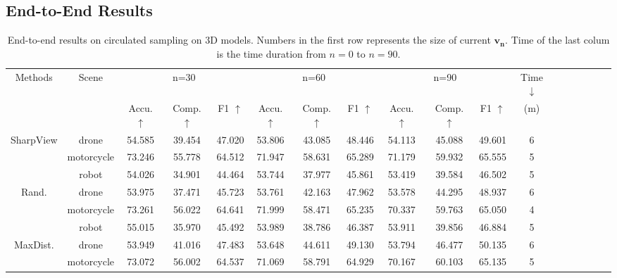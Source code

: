\subsection{End-to-End Results}
\begin{table*}[htb]
    \centering
    \caption{End-to-end results on circulated sampling on 3D models. Numbers in the first row represents the size of current $\bm{v_n}$. Time of the last colum is the time duration from $n=0$ to $n=90$.\label{model}}
    \begin{tabular}{|c|c|c|c|c|c|c|c|c|c|c|c|c|c|c|c|c|c|}
        \hline
        \multirow{2}{*}{Methods} & \multirow{2}{*}{Scene} & \multicolumn{3}{c|}{n=30}& \multicolumn{3}{c|}{n=60}& \multicolumn{3}{c|}{n=90} & Time$\downarrow$\\ \cline{3-11} 
        &  & Accu.$\uparrow$ & Comp. $\uparrow$& F1 $\uparrow$ & Accu.$\uparrow$ & Comp. $\uparrow$& F1 $\uparrow$& Accu. $\uparrow$& Comp. $\uparrow$& F1 $\uparrow$& (m) \\ \hline
        \multirow{3}{*}{SharpView} & drone & 54.585& 39.454& 47.020
            & 53.806& 43.085& 48.446
                & 54.113& 45.088& 49.601 & 6\\    \cline{2-12}
            & motorcycle & 73.246& 55.778& 64.512
            & 71.947& 58.631& 65.289
                & 71.179& 59.932& 65.555& 5\\                 \cline{2-12}
            & robot & 54.026& 34.901& 44.464
            & 53.744& 37.977& 45.861
                & 53.419& 39.584& 46.502& 5\\                      \hline
        \multirow{3}{*}{Rand.} & drone &53.975& 37.471& 45.723
            & 53.761& 42.163& 47.962
                & 53.578& 44.295& 48.937 & 6\\    \cline{2-12}
            & motorcycle & 73.261& 56.022& 64.641
            & 71.999& 58.471& 65.235
                & 70.337& 59.763& 65.050 & 4\\                 \cline{2-12}
            & robot & 55.015& 35.970& 45.492
            & 53.989& 38.786& 46.387
                & 53.911& 39.856& 46.884 & 5\\                      \hline
        \multirow{3}{*}{MaxDist.} & drone & 53.949& 41.016& 47.483
            & 53.648& 44.611& 49.130
                & 53.794& 46.477& 50.135 & 6\\    \cline{2-12}
            & motorcycle & 73.072& 56.002& 64.537
            & 71.069& 58.791& 64.929
                &70.167& 60.103& 65.135 & 5\\                 \cline{2-12}

\end{tabular}
\end{table*}
